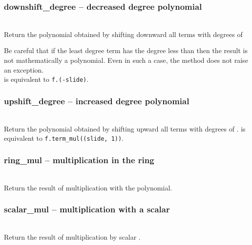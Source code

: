  \subsubsection{downshift\_degree -- decreased degree polynomial}
   \\
   \spacing
   \quad Return the polynomial obtained by shifting downward all terms
   with degrees of 

   Be careful that if the least degree term has the degree less than
    then the result is not mathematically a
   polynomial. Even in such a case, the method does not raise an
   exception.\\
   \spacing
   \quad {} is equivalent to
   {\tt f.(-slide)}.

 \subsubsection{upshift\_degree -- increased degree polynomial}
   \\
   \spacing
   \quad Return the polynomial obtained by shifting upward all terms
   with degrees of .
   \spacing
   \quad {} is equivalent to
   {\tt f.term\_mul((slide, 1))}.

   \subsubsection{ring\_mul -- multiplication in the ring}
   \\
   \spacing
   Return the result of multiplication with the  polynomial.

   \subsubsection{scalar\_mul -- multiplication with a scalar}
   \\
   \spacing
   Return the result of multiplication by scalar .

